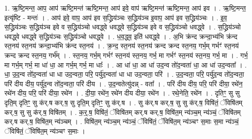 \documentclass[17pt]{extarticle}
\begin{document}
1. ऋ॒ष्टि॒मन्त॒ आप॒ आप॑ ऋष्टि॒मन्त॑ ऋष्टि॒मन्त॒ आप॑ इवे॒ वाप॑ ऋष्टि॒मन्त॑ ऋष्टि॒मन्त॒ आप॑ इव । . ऋ॒ष्टि॒मन्त॒ इत्यृ॑ष्टि - मन्तः॑ । . आप॑ इवे॒ वाप॒ आप॑ इव स॒द्ध्रिय॑ञ्चः स॒द्ध्रिय॑ञ्च इ॒वाप॒ आप॑ इव स॒द्ध्रिय॑ञ्चः । . इ॒व॒ स॒द्ध्रिय॑ञ्चः स॒द्ध्रिय॑ञ्च इवे व स॒द्ध्रिय॑ञ्चो धवद्ध्वे धवद्ध्वे स॒द्ध्रिय॑ञ्च इवे व स॒द्ध्रिय॑ञ्चो धवद्ध्वे । . स॒द्ध्रिय॑ञ्चो धवद्ध्वे धवद्ध्वे स॒द्ध्रिय॑ञ्चः स॒द्ध्रिय॑ञ्चो धवद्ध्वे । . ध॒व॒द्ध्व॒ इति॑ धवद्ध्वे । . अ॒भि क्र॑न्द क्रन्दा॒भ्य॑भि क्र॑न्द स्त॒नय॑ स्त॒नय॑ क्रन्दा॒भ्य॑भि क्र॑न्द स्त॒नय॑ । . क्र॒न्द॒ स्त॒नय॑ स्त॒नय॑ क्रन्द क्रन्द स्त॒नय॒ गर्भ॒म् गर्भꣳ॑ स्त॒नय॑ क्रन्द क्रन्द स्त॒नय॒ गर्भ᳚म् । . स्त॒नय॒ गर्भ॒म् गर्भꣳ॑ स्त॒नय॑ स्त॒नय॒ गर्भ॒ मा गर्भꣳ॑ स्त॒नय॑ स्त॒नय॒ गर्भ॒ मा । . गर्भ॒ मा गर्भ॒म् गर्भ॒ मा धा॑ धा॒ आ गर्भ॒म् गर्भ॒ मा धाः᳚ । . आ धा॑ धा॒ आ धा॑ उद॒न्व तो॑द॒न्वता॑ धा॒ आ धा॑ उद॒न्वता᳚ । . धा॒ उ॒द॒न्व तो॑द॒न्वता॑ धा धा उद॒न्वता॒ परि॒ पर्यु॑द॒न्वता॑ धा धा उद॒न्वता॒ परि॑ । . उ॒द॒न्वता॒ परि॒ पर्यु॑द॒न्व तो॑द॒न्वता॒ परि॑ दीय दीय॒ पर्यु॑द॒न्व तो॑द॒न्वता॒ परि॑ दीय । . उ॒द॒न्वतेत्यु॑दन्न् - वता᳚ । . परि॑ दीय दीय॒ परि॒ परि॑ दीया॒ रथे॑न॒ रथे॑न दीय॒ परि॒ परि॑ दीया॒ रथे॑न । . दी॒या॒ रथे॑न॒ रथे॑न दीय दीया॒ रथे॑न । . रथे॒नेति॒ रथे॑न । . दृतिꣳ॒॒ सु सु दृति॒म् दृतिꣳ॒॒ सु क॑र्.ष कर्.ष॒ सु दृति॒म् दृतिꣳ॒॒ सु क॑र्.ष । . सु क॑र्.ष कर्.ष॒ सु सु क॑र्.ष॒ विषि॑तं॒ ॅविषि॑तम् कर्.ष॒ सु सु क॑र्.ष॒ विषि॑तम् । . क॒र्॒.ष॒ विषि॑तं॒ ॅविषि॑तम् कर्.ष कर्.ष॒ विषि॑त॒म् न्य॑ञ्च॒म् न्य॑ञ्चं॒ ॅविषि॑तम् कर्.ष कर्.ष॒ विषि॑त॒म् न्य॑ञ्चम् । . विषि॑त॒म् न्य॑ञ्च॒म् न्य॑ञ्चं॒ ॅविषि॑तं॒ ॅविषि॑त॒म् न्य॑ञ्चꣳ स॒माः स॒मा न्य॑ञ्चं॒ ॅविषि॑तं॒ ॅविषि॑त॒म् न्य॑ञ्चꣳ स॒माः । \newline
\end{document}
